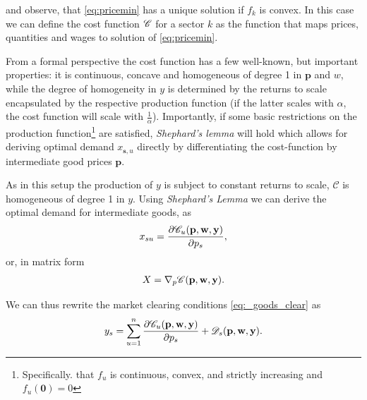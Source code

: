 and observe, that \eqref{eq:pricemin} has a unique solution if $f_k$ is convex.
In this case we can define the cost function $\mathscr{C}$ for a sector $k$ as the function that maps prices, quantities and wages to solution of \eqref{eq:pricemin}. 

From a formal perspective the cost function has a few well-known, but important properties:
it is continuous, concave and homogeneous of degree 1 in $\mathbf p$ and $w$, while the degree of homogeneity in $y$ is determined by the returns to scale encapsulated by the respective production function (if the latter scales with $\alpha$, the cost function will scale with $\frac{1}{\alpha}$). 
Importantly, if some basic restrictions on the production function\footnote{Specifically. that $f_u$ is continuous, convex, and strictly increasing and $f_u(\mathbf 0) = 0$} are satisfied, \textit{Shephard's lemma} will hold which allows for deriving optimal demand $x_{\mathbf{s},u}$ directly by differentiating the cost-function by intermediate good prices $\mathbf{p}$.

As in this setup the production of $y$ is subject to constant returns to scale, $\mathscr C$ is homogeneous of degree 1 in $ y$. Using \textit{Shephard's Lemma} we can derive the optimal demand for intermediate goods, as 
\begin{align}
  x_{su} = \frac{\partial \mathscr{C}_u(\mathbf p,\mathbf w,\mathbf y)}{\partial p_s},
\end{align}
or, in matrix form
\begin{align}
  X = \nabla_p \mathscr{C}(\mathbf p,\mathbf w,\mathbf y).
\end{align}

We can thus rewrite the market clearing conditions \eqref{eq:_goods_clear} as
\begin{align}
\label{eq:market_clearing_sheppard}
  y_s = \sum_{u = 1}^n \frac{\partial \mathscr{C}_u(\mathbf p,\mathbf w,\mathbf y)}{\partial p_s} + \mathscr{D}_s(\mathbf{p},\mathbf{w},\mathbf{y}).
\end{align}

